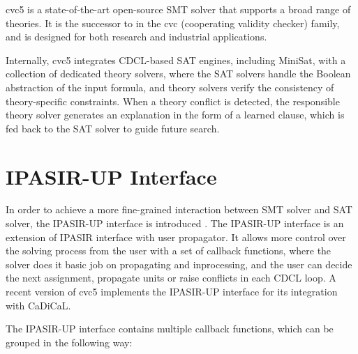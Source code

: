 cvc5 is a state-of-the-art open-source SMT solver that supports a broad range of theories. \cite{10.1007/978-3-030-99524-9_24} It is the successor to  in the cvc (cooperating validity checker) family, and is designed for both research and industrial applications.

Internally, cvc5 integrates CDCL-based SAT engines, including  MiniSat, with a collection of dedicated theory solvers, where the SAT solvers handle the Boolean abstraction of the input formula, and theory solvers verify the consistency of theory-specific constraints. When a theory conflict is detected, the responsible theory solver generates an explanation in the form of a learned clause, which is fed back to the SAT solver to guide future search.

\section{IPASIR-UP Interface}

In order to achieve a more fine-grained interaction between SMT solver and SAT solver, the IPASIR-UP interface is introduced \cite{fazekas_et_al:LIPIcs.SAT.2023.8}. The IPASIR-UP interface is an extension of IPASIR interface with user propagator. It allows more control over the solving process from the user with a set of callback functions, where the solver does it basic job on propagating and inprocessing, and the user can decide the next assignment, propagate units or raise conflicts in each CDCL loop. A recent version of cvc5 implements the IPASIR-UP interface for its integration with CaDiCaL.

The IPASIR-UP interface contains multiple callback functions, which can be grouped in the following way:


